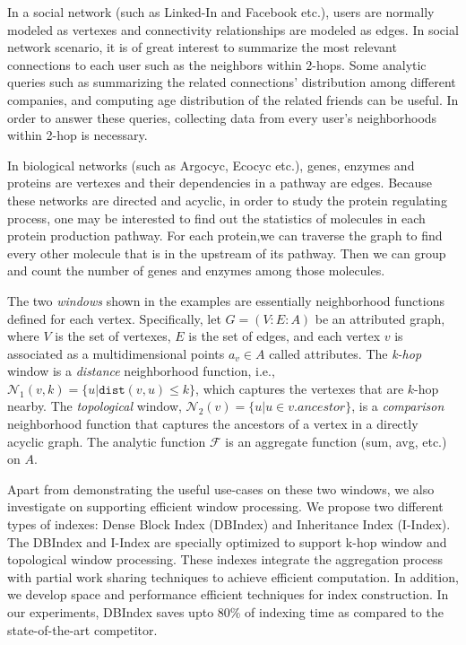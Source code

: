 \begin{example}
In a social network (such as Linked-In and Facebook etc.), users are normally modeled as vertexes and connectivity relationships are modeled as edges. In social network scenario, it is of great interest to summarize the most relevant connections to each user such as the neighbors within $2$-hops. Some analytic queries such as summarizing the related connections' distribution among different companies, and computing age distribution of the related friends can be useful. In order to answer these queries, collecting data from every user's neighborhoods within 2-hop is necessary.
\end{example}
\begin{example}
In biological networks (such as Argocyc, Ecocyc etc.), genes, enzymes and proteins are vertexes and their
dependencies in a pathway are edges. Because these networks are directed and acyclic, 
in order to study the protein regulating process, one may be interested to find out the statistics of molecules in each protein production pathway. For each protein,we can traverse the graph to find every other 
 molecule that is in the upstream of its pathway. Then we can group and 
 count the number of genes and enzymes among those molecules.
\end{example}

The two \emph{windows} shown in the examples are essentially neighborhood functions defined for each vertex. Specifically, let $G=(V:E:A)$ be an attributed graph, where $V$ is the set of vertexes, $E$ is the set of edges, and each vertex $v$ is associated as a multidimensional points $a_v \in A$ called attributes.
The \emph{k-hop} window is a \emph{distance} neighborhood function, 
i.e., $\mathcal{N}_1(v,k)= \{u|\mathtt{dist}(v,u) \leq k\}$, 
which captures the vertexes that are $k$-hop nearby. 
The \emph{topological} window,  $\mathcal{N}_2(v)= \{u | u \in v.ancestor\}$,
is a \emph{comparison} neighborhood function that captures
the ancestors of a vertex in a directly acyclic graph.  The analytic function $\mathcal{F}$ is an aggregate function (sum, avg, etc.) on $A$.

Apart from demonstrating the useful use-cases on these two windows, we also investigate on supporting efficient window processing. 
We propose
two different types of indexes: Dense Block Index (DBIndex)
and Inheritance Index (I-Index). The DBIndex and I-Index
are specially optimized to support k-hop window and topological
window processing. These indexes
integrate the aggregation process with partial work sharing techniques
to achieve efficient computation.
In addition, we develop space and performance efficient techniques
for index construction. In our experiments, DBIndex saves upto 80\%
of indexing time as compared to the state-of-the-art competitor.



